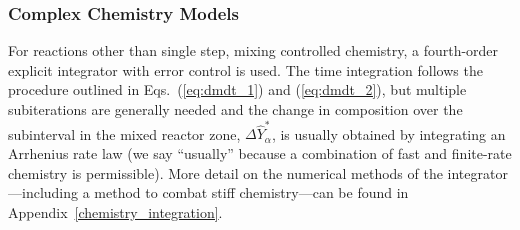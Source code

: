 \subsubsection{Complex Chemistry Models}

For reactions other than single step, mixing controlled chemistry, a fourth-order explicit integrator with error control is used. The time integration follows the procedure outlined in Eqs.~(\ref{eq:dmdt_1}) and (\ref{eq:dmdt_2}), but multiple subiterations are generally needed and the change in composition over the subinterval in the mixed reactor zone, $\Delta \hat{Y}_\alpha^*$, is usually obtained by integrating an Arrhenius rate law (we say ``usually'' because a combination of fast and finite-rate chemistry is permissible). More detail on the numerical methods of the integrator---including a method to combat stiff chemistry---can be found in Appendix~\ref{chemistry_integration}.



